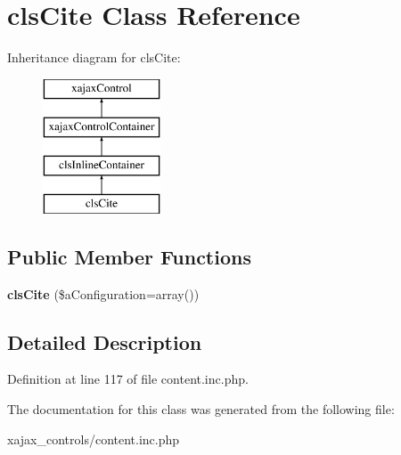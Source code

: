 \hypertarget{classclsCite}{
\section{clsCite Class Reference}
\label{classclsCite}
}
Inheritance diagram for clsCite:\begin{figure}[H]
\begin{center}
\leavevmode
\includegraphics[height=4.000000cm]{classclsCite}
\end{center}
\end{figure}
\subsection*{Public Member Functions}
\begin{DoxyCompactItemize}
\item 
\hypertarget{classclsCite_a14b2e3135e616318937f8d86cddea132}{
{\bfseries clsCite} (\$aConfiguration=array())}
\label{classclsCite_a14b2e3135e616318937f8d86cddea132}

\end{DoxyCompactItemize}


\subsection{Detailed Description}


Definition at line 117 of file content.inc.php.



The documentation for this class was generated from the following file:\begin{DoxyCompactItemize}
\item 
xajax\_\-controls/content.inc.php\end{DoxyCompactItemize}
